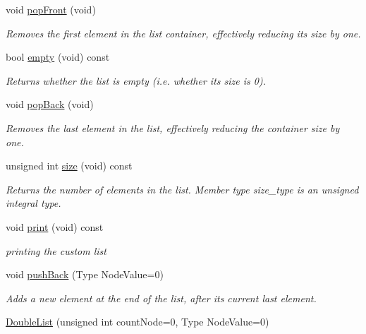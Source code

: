 \begin{DoxyCompactItemize}
void \hyperlink{classDoubleList_ac2adea48c1884e2b521dae62708917ea}{pop\+Front} (void)
\begin{DoxyCompactList}\small\item\em Removes the first element in the list container, effectively reducing its size by one. \end{DoxyCompactList}\item 
bool \hyperlink{classDoubleList_a0ab37dfffb686afb02591b1e390043e5}{empty} (void) const
\begin{DoxyCompactList}\small\item\em Returns whether the list is empty (i.\+e. whether its size is 0). \end{DoxyCompactList}\item 
\mbox{\label{classDoubleList_aaa18b7dec106ac0c9bba5cfbc647cf82}} 
void \hyperlink{classDoubleList_aaa18b7dec106ac0c9bba5cfbc647cf82}{pop\+Back} (void)
\begin{DoxyCompactList}\small\item\em Removes the last element in the list, effectively reducing the container size by one. \end{DoxyCompactList}\item 
unsigned int \hyperlink{classDoubleList_a4d41e1e9987abfacc315bbce462618c2}{size} (void) const
\begin{DoxyCompactList}\small\item\em Returns the number of elements in the list. Member type size\+\_\+type is an unsigned integral type. \end{DoxyCompactList}\item 
\mbox{\label{classDoubleList_a28c311d57a9a2425a4af2691dc158aac}} 
void \hyperlink{classDoubleList_a28c311d57a9a2425a4af2691dc158aac}{print} (void) const
\begin{DoxyCompactList}\small\item\em printing the custom list \end{DoxyCompactList}\item 
void \hyperlink{classDoubleList_ad837f0847d561642747af47645952cfd}{push\+Back} (Type Node\+Value=0)
\begin{DoxyCompactList}\small\item\em Adds a new element at the end of the list, after its current last element. \end{DoxyCompactList}\item 
\hyperlink{classDoubleList_a0a5f827968e87609730b0a97dcd08105}{Double\+List} (unsigned int count\+Node=0, Type Node\+Value=0)

\end{DoxyCompactItemize}
